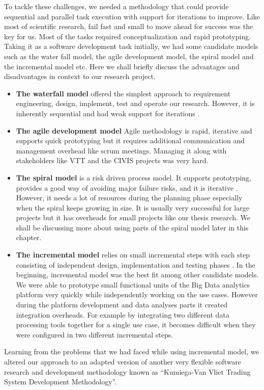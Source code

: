 To tackle these challenges, we needed a methodology that could provide sequential and parallel task execution with support for iterations to improve. Like most of scientific research, fail fast and small to move ahead for success was the key for us. Most of the tasks required conceptualization and rapid prototyping. Taking it as a software development task initially, we had some candidate models such as the water fall model, the agile development model, the spiral model and the incremental model etc. Here we shall briefly discuss the advantages and disadvantages in context to our research project. 
\begin{itemize}
\item \textbf{The waterfall model} offered the simplest approach to requirement engineering, design, implement, test and operate our research. However, it is inherently sequential and had weak support for iterations \cite{Laplante}.
\item \textbf{The agile development model} Agile methodology \cite{martin2003agile} is rapid, iterative and supports quick prototyping but it requires additional communication and management overhead like scrum meetings. Managing it along with stakeholders like VTT and the CIVIS projects was very hard.
\item \textbf{The spiral model} is a risk driven process model. It supports prototyping, provides a good way of avoiding major failure risks, and it is iterative \cite{Boehm}. However, it needs a lot of resources during the planning phase especially when the spiral keeps growing in size. It is usually very successful for large projects but it has overheads for small projects like our thesis research. We shall be discussing more about using parts of the spiral model later in this chapter.
\item \textbf{The incremental model} relies on small incremental steps with each step consisting of independent design, implementation and testing phases \cite{jacobson1999unified}. In the beginning, incremental model was the best fit among other candidate models. We were able to prototype small functional units of the Big Data analytics platform very quickly while independently working on the use cases. However during the platform development and data analyses parts it created integration overheads. For example by integrating two different data processing tools together for a single use case, it becomes difficult when they were configured in two different incremental steps.  
\end{itemize}
Learning from the problems that we had faced while using incremental model, we altered our approach to an adapted version of another very flexible software research and development methodology known as ``Kumiega-Van Vliet Trading System Development Methodology''\cite{kumiega2008software}.

